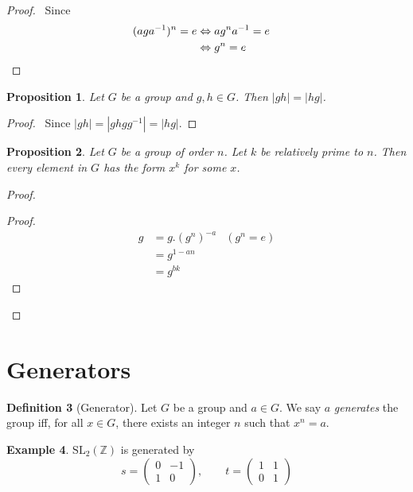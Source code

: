 \documentclass{book}
\let\qed\relax
\newtheorem{prop}{Proposition}[chapter]
\theoremstyle{definition}
\newtheorem{df}[prop]{Definition}
\newtheorem{ex}[prop]{Example}
\newcommand{\inv}[1]{\ensuremath{{#1}^{-1}}}
\begin{document}
\begin{proof}
    \pf\ Since
    \begin{align*}
        (ag\inv{a})^n = e & \Leftrightarrow a g^n \inv{a} = e        \\
                          & \Leftrightarrow g^n = e           & \qed
    \end{align*}
\end{proof}

\begin{prop}
    Let $G$ be a group and $g,h \in G$. Then $|gh| = |hg|$.
\end{prop}

\begin{proof}
    \pf\ Since $|gh| = |ghg\inv{g}| = |hg|$. \qed
\end{proof}

\begin{prop}
Let $G$ be a group of order $n$. Let $k$ be relatively prime to $n$. Then every element in $G$ has the form $x^k$ for some $x$.
\end{prop}

\begin{proof}
\begin{proof}
\pf
\begin{align*}
g & = g. (g^n)^{-a} & (g^n = e) \\
& = g^{1-an} \\
& = g^{bk}
\end{align*}
\end{proof}
\qed
\end{proof}

\section{Generators}

\begin{df}[Generator]
    Let $G$ be a group and $a \in G$. We say $a$ \emph{generates} the group iff, for all $x \in G$, there exists an integer $n$ such that $x^n = a$.
\end{df}

\begin{ex}
\label{ex:SL2Z}
$\mathrm{SL}_2(\mathbb{Z})$ is generated by
\[ s = \left( \begin{array}{cc}
0 & -1 \\ 1 & 0
\end{array} \right), \qquad
t = \left( \begin{array}{cc}
1 & 1 \\
0 & 1
\end{array} \right) \]
\end{ex}
\end{document}
